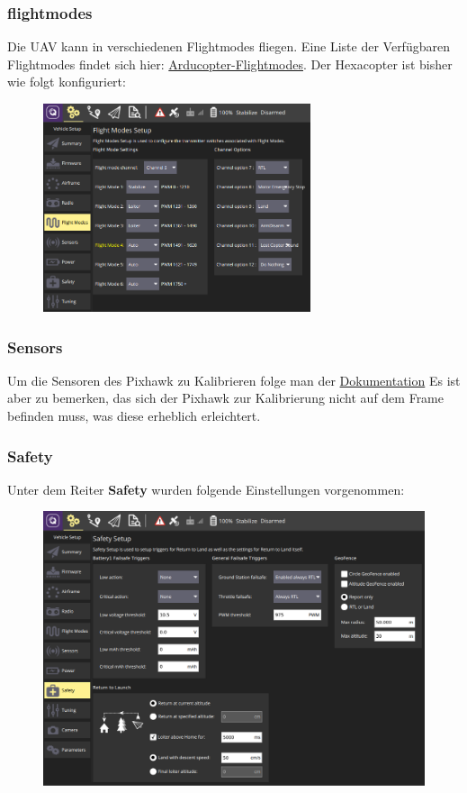 \documentclass[12pt]{article}
\begin{document}
\subsubsection{flightmodes}
Die UAV kann in verschiedenen Flightmodes fliegen. Eine Liste der Verfügbaren Flightmodes findet sich hier: \hyperlink{http://ardupilot.org/copter/docs/flight-modes.html}{Arducopter-Flightmodes}.
Der Hexacopter ist bisher wie folgt konfiguriert:
\begin{figure}[H]
\centering
\includegraphics[width=0.7\textwidth]{flight-modes.png}
\end{figure}
\subsubsection{Sensors}
Um die Sensoren des Pixhawk zu Kalibrieren folge man der \hyperlink{https://docs.qgroundcontrol.com/en/SetupView/Sensors.html}{Dokumentation}
Es ist aber zu bemerken, das sich der Pixhawk zur Kalibrierung nicht auf dem Frame befinden muss, was diese erheblich erleichtert.
\subsubsection{Safety}
Unter dem Reiter \textbf{Safety} wurden folgende Einstellungen vorgenommen:
\begin{figure}[H]
\centering
\includegraphics[width=\textwidth]{safety.png}
\end{figure}
\end{document}
